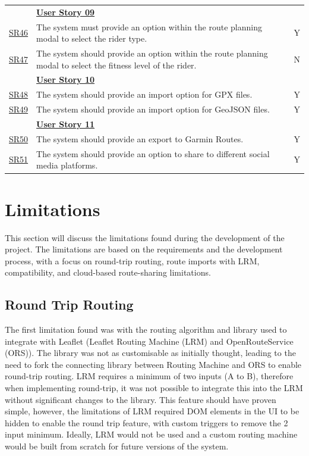 \begin{table}[!htb]
\begin{tabularx}{\textwidth}{ p{1cm} p{11cm} p{1cm} }
        \hline
        & \textbf{\hyperref[tab:user-story-09]{User Story 09}}  \\
        \hyperref[SR:46]{SR46} & The system must provide an option within the route planning modal to select the rider type. & Y\\
        \hyperref[SR:47]{SR47} & The system should provide an option within the route planning modal to select the fitness level of the rider. & N\\
        \hline
        & \textbf{\hyperref[tab:user-story-10]{User Story 10}}  \\
        \hyperref[SR:48]{SR48} & The system should provide an import option for GPX files. & Y\\
        \hyperref[SR:49]{SR49} & The system should provide an import option for GeoJSON files. & Y\\
        \hline
        & \textbf{\hyperref[tab:user-story-11]{User Story 11}} \\
        \hyperref[SR:50]{SR50} & The system should provide an export to Garmin Routes. & Y\\
        \hyperref[SR:51]{SR51} & The system should provide an option to share to different social media platforms. & Y\\
        \hline
    \end{tabularx}
\end{table}
\endgroup

\clearpage
\section{Limitations}
\label{evaluation:limitations}

This section will discuss the limitations found during the development of the project. The limitations are based on the requirements and the development process, with a focus on round-trip routing, route imports with LRM, compatibility, and cloud-based route-sharing limitations.

\subsection{Round Trip Routing}
The first limitation found was with the routing algorithm and library used to integrate with Leaflet (Leaflet Routing Machine (LRM) and OpenRouteService (ORS)). The library was not as customisable as initially thought, leading to the need to fork the connecting library between Routing Machine and ORS to enable round-trip routing. LRM requires a minimum of two inputs (A to B), therefore when implementing round-trip, it was not possible to integrate this into the LRM without significant changes to the library. This feature should have proven simple, however, the limitations of LRM required DOM elements in the UI to be hidden to enable the round trip feature, with custom triggers to remove the 2 input minimum. Ideally, LRM would not be used and a custom routing machine would be built from scratch for future versions of the system.


